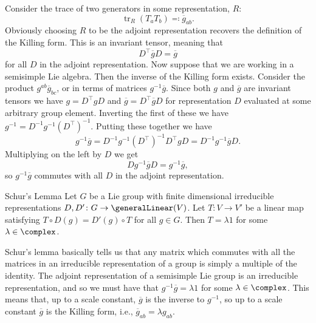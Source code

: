 \documentclass[fleqn]{NotesClass}
\newcommand{\ident}{1}
\newcommand{\trans}{\top}
\DeclareMathOperator{\tr}{tr}
\begin{document}
    Consider the trace of two generators in some representation, \(R\):
    \begin{equation}
        \tr_{R}(T_aT_b) \eqqcolon \overbar{g}_{ab}.
    \end{equation}
    Obviously choosing \(R\) to be the adjoint representation recovers the definition of the Killing form.
    This is an invariant tensor, meaning that
    \begin{equation}
        D^\trans \overbar{g} D = \overbar{g}
    \end{equation}
    for all \(D\) in the adjoint representation.
    Now suppose that we are working in a semisimple Lie algebra.
    Then the inverse of the Killing form exists.
    Consider the product \(g^{ab}\overbar{g}_{bc}\), or in terms of matrices \(g^{-1}\overbar{g}\).
    Since both \(g\) and \(\overbar{g}\) are invariant tensors we have \(g = D^\trans g D\) and \(\overbar{g} = D^\trans \overbar{g} D\) for representation \(D\) evaluated at some arbitrary group element.
    Inverting the first of these we have \(g^{-1} = D^{-1}g^{-1}(D^\trans)^{-1}\).
    Putting these together we have
    \begin{equation}
        g^{-1} \overbar{g} = D^{-1} g^{-1} (D^\trans)^{-1} D^{\trans} g D = D^{-1}g^{-1}\overbar{g}D.
    \end{equation}
    Multiplying on the left by \(D\) we get
    \begin{equation}
        D g^{-1} \overbar{g} D = g^{-1}\overbar{g},
    \end{equation}
    so \(g^{-1}\overbar{g}\) commutes with all \(D\) in the adjoint representation.
    
    \begin{lma}{Schur's Lemma}{}
        Let \(G\) be a Lie group with finite dimensional irreducible representations \(D, D' \colon G \to \generalLinear(V)\).
        Let \(T \colon V \to V'\) be a linear map satisfying \(T \circ D(g) = D'(g) \circ T\) for all \(g \in G\).
        Then \(T = \lambda \ident\) for some \(\lambda \in \complex\).
    \end{lma}
    
    Schur's lemma basically tells us that any matrix which commutes with all the matrices in an irreducible representation of a group is simply a multiple of the identity.
    The adjoint representation of a semisimple Lie group is an irreducible representation, and so we must have that \(g^{-1}\overbar{g} = \lambda \ident\) for some \(\lambda \in \complex\).
    This means that, up to a scale constant, \(\overbar{g}\) is the inverse to \(g^{-1}\), so up to a scale constant \(\overbar{g}\) is the Killing form, i.e., \(\overbar{g}_{ab} = \lambda g_{ab}\).
    
\end{document}
